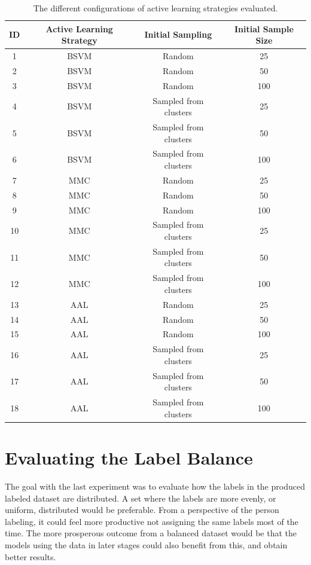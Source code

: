 \begin{table}
    \centering
    \begin{tabular}{|cccc|}
        \hline
        \textbf{ID} & \textbf{Active Learning Strategy} & \textbf{Initial Sampling} & \textbf{Initial Sample Size}\\
        \hline
        1 & BSVM & Random & 25\\
        2 & BSVM & Random & 50\\
        3 & BSVM & Random & 100\\
        4 & BSVM & Sampled from clusters & 25\\
        5 & BSVM & Sampled from clusters & 50\\
        6 & BSVM & Sampled from clusters & 100\\
        7 & MMC & Random & 25\\
        8 & MMC & Random & 50\\
        9 & MMC & Random & 100\\
        10 & MMC & Sampled from clusters & 25\\
        11 & MMC & Sampled from clusters & 50\\
        12 & MMC & Sampled from clusters & 100\\
        13 & AAL & Random & 25\\
        14 & AAL & Random & 50\\
        15 & AAL & Random & 100\\
        16 & AAL & Sampled from clusters & 25\\
        17 & AAL & Sampled from clusters & 50\\
        18 & AAL & Sampled from clusters & 100\\
        \hline
    \end{tabular}
    \caption{The different configurations of active learning strategies evaluated.}
    \label{fig:active-learning-configurations}
\end{table}

\section{Evaluating the Label Balance}
The goal with the last experiment was to evaluate how the labels in the produced labeled dataset are distributed.
A set where the labels are more evenly, or uniform, distributed would be preferable.
From a perspective of the person labeling, it could feel more productive not assigning the same labels most of the time.
The more prosperous outcome from a balanced dataset would be that the models using the data in later stages could also benefit from this, and obtain better results.


